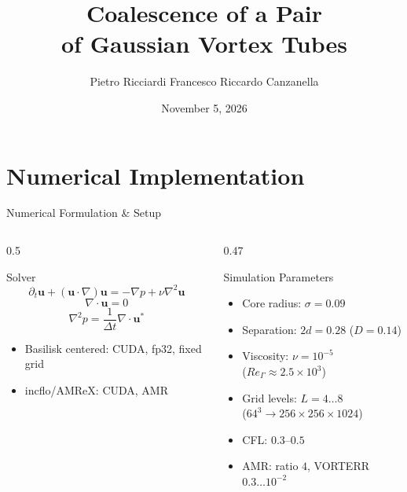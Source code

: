 \documentclass[10pt,aspectratio=43]{beamer}
\title[Coalescence of Vortex Tubes]{Coalescence of a Pair\\of Gaussian Vortex Tubes}
\author[Ricciardi, Canzanella]{Pietro Ricciardi \quad Francesco Riccardo Canzanella}
\institute{M2 Fluid Mechanics}
\date{November 5, 2026}
\begin{document}
\section{Numerical Implementation}
\begin{frame}{Numerical Formulation \& Setup}
  \begin{columns}[T]
    \begin{column}{0.5\textwidth}
      \begin{block}{Solver}
        \[
          \partial_{t}\mathbf{u}+(\mathbf{u}\cdot\nabla)\mathbf{u}
          =-\nabla p+\nu\nabla^{2}\mathbf{u}
        \]
        \[
          \nabla\cdot\mathbf{u}=0
        \]
        \[
          \nabla^{2}p=\frac{1}{\Delta t}\nabla\cdot\mathbf{u}^{*}
        \]
        \begin{itemize}
          \item Basilisk centered: CUDA, fp32, fixed grid
          \item incflo/AMReX: CUDA, AMR
        \end{itemize}
      \end{block}
    \end{column}
    \begin{column}{0.47\textwidth}
      \begin{block}{Simulation Parameters}
        \begin{itemize}
          \item Core radius: $\sigma=0.09$
          \item Separation: $2d=0.28$ ($D=0.14$)
          \item Viscosity: $\nu=10^{-5}$ \\
                ($Re_{\Gamma}\approx 2.5\times10^{3}$)
          \item Grid levels: $L=4\ldots8$ \\
                ($64^{3}\to 256\times256\times1024$)
          \item CFL: $0.3$--$0.5$
          \item AMR: ratio $4$, VORTERR $0.3\ldots10^{-2}$
        \end{itemize}
      \end{block}
    \end{column}
  \end{columns}
\end{frame}
\end{document}
